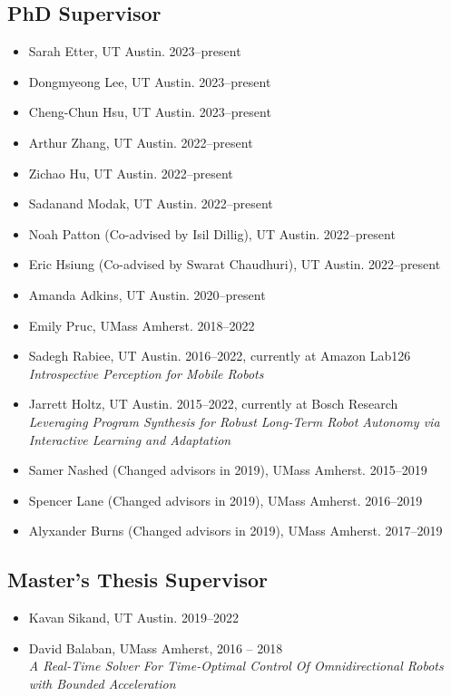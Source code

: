 \documentclass[Times]{article}
\begin{document}
\subsection*{PhD Supervisor}
\begin{itemize}
  \item Sarah Etter, UT Austin. 2023--present
  \item Dongmyeong Lee, UT Austin. 2023--present
  \item Cheng-Chun Hsu, UT Austin. 2023--present
  \item Arthur Zhang, UT Austin. 2022--present
  \item Zichao Hu, UT Austin. 2022--present
  \item Sadanand Modak, UT Austin. 2022--present
  \item Noah Patton (Co-advised by Isil Dillig), UT Austin. 2022--present
  \item Eric Hsiung (Co-advised by Swarat Chaudhuri), UT Austin. 2022--present
  \item Amanda Adkins, UT Austin. 2020--present
  \item Emily Pruc, UMass Amherst. 2018--2022
  \item Sadegh Rabiee, UT Austin. 2016--2022, currently at Amazon Lab126 \\
  \emph{Introspective Perception for Mobile Robots}
  \item Jarrett Holtz, UT Austin. 2015--2022, currently at Bosch Research \\
  \emph{Leveraging Program Synthesis for Robust Long-Term Robot Autonomy via\\ Interactive Learning and Adaptation}
  \item Samer Nashed (Changed advisors in 2019), UMass Amherst. 2015--2019
  \item Spencer Lane (Changed advisors in 2019), UMass Amherst. 2016--2019
  \item Alyxander Burns (Changed advisors in 2019), UMass Amherst. 2017--2019
\end{itemize}

\subsection*{Master's Thesis Supervisor}
\begin{itemize}
 \item Kavan Sikand, UT Austin. 2019--2022
 \item David Balaban, UMass Amherst, 2016 -- 2018\\
 \emph{A Real-Time Solver For Time-Optimal Control Of Omnidirectional Robots with Bounded Acceleration}
\end{itemize}
\end{document}
